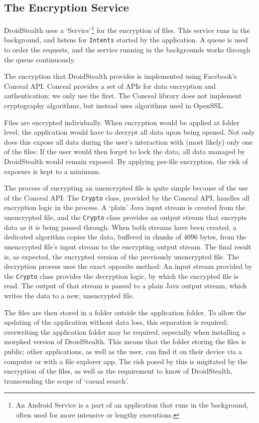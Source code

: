 \subsection{The Encryption Service}
\label{sec:implementation:encryption}
DroidStealth uses a `Service'\footnote{An Android Service is a part of an application that runs in the background, often used for more intensive or lengthy executions.} for the encryption of files.
This service runs in the background, and listens for \texttt{Intents} started by the application.
A queue is used to order the requests, and the service running in the backgrounds works through the queue continuously.

The encryption that DroidStealth provides is implemented using Facebook's Conceal API\cite{facebookConceal}.
Conceal provides a set of APIs for data encryption and authentication; we only use the first.
The Conceal library does not implement cryptography algorithms, but instead uses algorithms used in OpenSSL\cite{openssl}.

Files are encrypted individually.
When encryption would be applied at folder level, the application would have to decrypt all data upon being opened.
Not only does this expose all data during the user's interaction with (most likely) only one of the files:
If the user would then forget to lock the data, all data managed by DroidStealth would remain exposed.
By applying per-file encryption, the risk of exposure is kept to a minimum.

The process of encrypting an unencrypted file is quite simple because of the use of the Conceal API:
The \texttt{Crypto} class, provided by the Conceal API, handles all encryption logic in the process.
A `plain' Java input stream is created from the unencrypted file, and the \texttt{Crypto} class provides an output stream that encrypts data as it is being passed through.
When both streams have been created, a dedicated algorithm copies the data, buffered in chunks of 4096 bytes, from the unencrypted file's input stream to the encrypting output stream.
The final result is, as expected, the encrypted version of the previously unencrypted file.
The decryption process uses the exact opposite method:
An input stream provided by the \texttt{Crypto} class provides the decryption logic, by which the encrypted file is read.
The output of that stream is passed to a plain Java output stream, which writes the data to a new, unencrypted file.

The files are then stored in a folder outside the application folder.
To allow the updating of the application without data loss, this separation is required; overwriting the application folder may be required, especially when installing a morphed version of DroidStealth.
This means that the folder storing the files is public; other applications, as well as the user, can find it on their device via a computer or with a file explorer app.
The risk posed by this is migitated by the encryption of the files, as well as the requirement to know of DroidStealth, transcending the scope of `casual search'.
